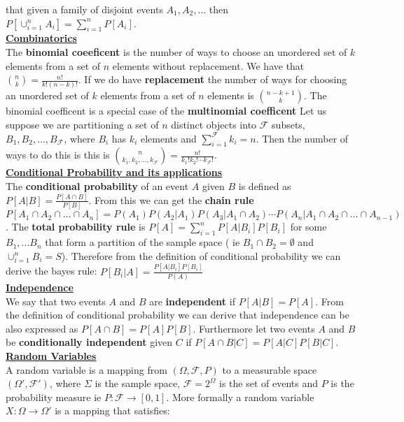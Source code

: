 \documentclass[10pt]{article}
\begin{document}
that given a family of disjoint events $A_1,A_2,\dots$ then $P[\cup_{i=1}^n A_i]=\sum_{i=1}^n P[A_i]$.\\
\underline{\textbf{Combinatorics}}\\
The \textbf{binomial coeeficent} is the number of ways 
to choose an unordered set of $k$ elements from a set of $n$ elements without replacement.
We have that ${n\choose k}=\frac{n!}{k!(n-k)!}$. If we do have \textbf{replacement} 
the number of ways for choosing an unordered set of $k$ elements from a set of $n$ elements is
$n-k+1\choose k$. The binomial coefficent is a special case of the \textbf{multinomial coefficent}
Let us suppose we are partitioning a set of $n$ distinct objects into 
$\mathcal{F}$ subsets, $B_1,B_2,\dots,B_\mathcal{F}$, where $B_i$ has $k_i$ elements and
$\sum_{i=1}^\mathcal{F} k_i=n$. Then the number of ways to do this is this is ${n\choose k_1,k_2,\dots,k_\mathcal{F}}=\frac{n!}{k_1!k_2!\cdots k_{\mathcal{F}}!}$.
\\\underline{\textbf{Conditional Probability and its applications}}\\
The \textbf{conditional probability} of an event $A$ given $B$ is defined as $P[A|B]=\frac{P[A\cap B]}{P[B]}$.
From this we can get the \textbf{chain rule} $P[A_1\cap A_2\cap\dots\cap A_n]=
P(A_1)P(A_2|A_1)P(A_3|A_1\cap A_2)\cdots P(A_n|A_1\cap A_2\cap\dots\cap A_{n-1})$.
The \textbf{total probability rule} is $P[A]=\sum_{i=1}^n P[A|B_i]P[B_i]$ 
for some $B_1,...B_n$ that form a partition of the sample space (
ie $B_1\cap B_2=\emptyset$ and $\cup_{i=1}^n B_i=S$). Therefore from 
the definition of conditional probability we can derive the bayes rule:
$P[B_i|A]=\frac{P[A|B_i]P[B_i]}{P(A)}$\\
\underline{\textbf{Independence}}\\
We say that two events $A$ and $B$ are \textbf{independent} if $P[A|B]=P[A]$.
From the definition of conditional probability we can derive that
independence can be also expressed as $P[A\cap B]=P[A]P[B]$. 
Furthermore let two events $A$ and $B$ be
\textbf{conditionally independent} given $C$ if $P[A\cap B | C]=
P[A|C]P[B|C]$.\\
\underline{\textbf{Random Variables}}\\
A random variable is a mapping from $(\Omega,\mathcal{F},P)$ to a measurable
space $(\Omega',\mathcal{F}')$, where $\Sigma$ is the sample space, 
$\mathcal{F}=2^\Omega$ is the set of events and $P$ is the probability measure
ie $P:\mathcal{F}\rightarrow [0,1]$. More formally a random variable
$X:\Omega\rightarrow \Omega'$ is a mapping that satisfies:
\end{document}
